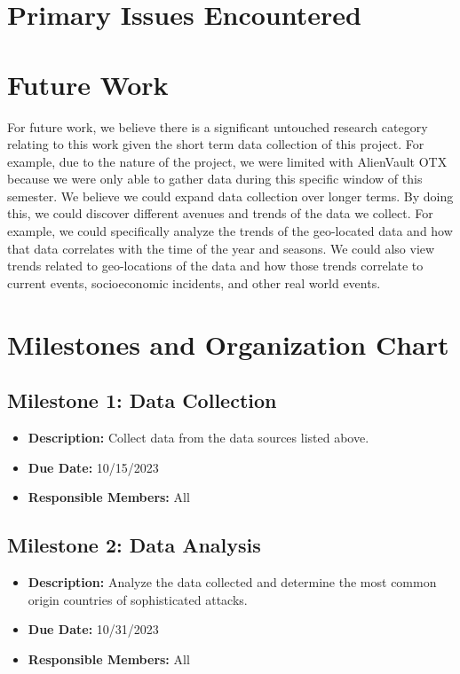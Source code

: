 \documentclass[letterpaper, 10 pt, conference]{ieeeconf}  %
\begin{document}
\section{Primary Issues Encountered}

\section{Future Work}
For future work, we believe there is a significant untouched research category relating to this work given the short term data collection of this project. For example, due to the nature of the project,
 we were limited with AlienVault OTX because we were only able to gather data during this specific window of this semester. We believe we could expand data collection over longer terms. By doing this, 
 we could discover different avenues and trends of the data we collect. For example, we could specifically analyze the trends of the geo-located data and how that data correlates with the time of the year and seasons.
  We could also view trends related to geo-locations of the data and how those trends correlate to current events, socioeconomic incidents, and other real world events. 
\section{Milestones and Organization Chart}

    \subsection*{Milestone 1: Data Collection}
    \begin{itemize}
        \item \textbf{Description:} Collect data from the data sources listed above.
        \item \textbf{Due Date:} 10/15/2023
        \item \textbf{Responsible Members:} All
    \end{itemize}
    \subsection*{Milestone 2: Data Analysis}
    \begin{itemize}
        \item \textbf{Description:} Analyze the data collected and determine the most common origin countries of sophisticated attacks.
        \item \textbf{Due Date:} 10/31/2023
        \item \textbf{Responsible Members:} All
    \end{itemize}
\end{document}

